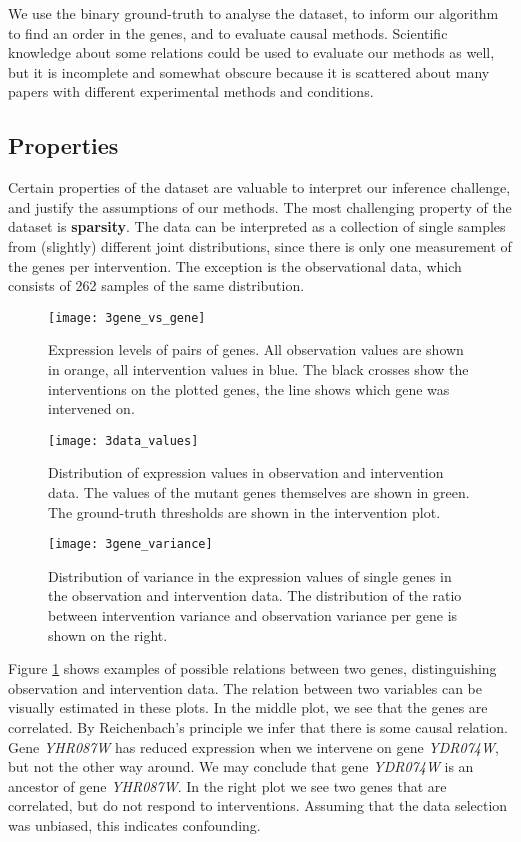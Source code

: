 We use the binary ground-truth to analyse the dataset, to inform our algorithm to find an order in the genes, and to evaluate causal methods. Scientific knowledge about some relations could be used to evaluate our methods as well, but it is incomplete and somewhat obscure because it is scattered about many papers with different experimental methods and conditions. 

\subsection{Properties}

Certain properties of the dataset are valuable to interpret our inference challenge, and justify the assumptions of our methods. The most challenging property of the dataset is \textbf{sparsity}. The data can be interpreted as a collection of single samples from (slightly) different joint distributions, since there is only one measurement of the genes per intervention. The exception is the observational data, which consists of 262 samples of the same distribution.

\begin{figure}[h]
    \centering
    \texttt{[image: 3gene\_vs\_gene]}
    \caption{Expression levels of pairs of genes. All observation values are shown in orange, all intervention values in blue. The black crosses show the interventions on the plotted genes, the line shows which gene was intervened on.}
    \label{fig:3:genevsgene}
\end{figure}

\begin{figure}[h]
    \centering
    \texttt{[image: 3data\_values]}
    \caption{Distribution of expression values in observation and intervention data. The values of the mutant genes themselves are shown in green. The ground-truth thresholds are shown in the intervention plot.}
    \label{fig:3:datavalues}
\end{figure}

\begin{figure}[h]
    \centering
    \texttt{[image: 3gene\_variance]}
    \caption{Distribution of variance in the expression values of single genes in the observation and intervention data. The distribution of the ratio between intervention variance and observation variance per gene is shown on the right.}
    \label{fig:3:datavariance}
\end{figure}

Figure \ref{fig:3:genevsgene} shows examples of possible relations between two genes, distinguishing observation and intervention data. The relation between two variables can be visually estimated in these plots. In the middle plot, we see that the genes are correlated. By Reichenbach's principle we infer that there is some causal relation. Gene \textit{YHR087W} has reduced expression when we intervene on gene \textit{YDR074W}, but not the other way around. We may conclude that gene \textit{YDR074W} is an ancestor of gene \textit{YHR087W}. In the right plot we see two genes that are correlated, but do not respond to interventions. Assuming that the data selection was unbiased, this indicates confounding.

